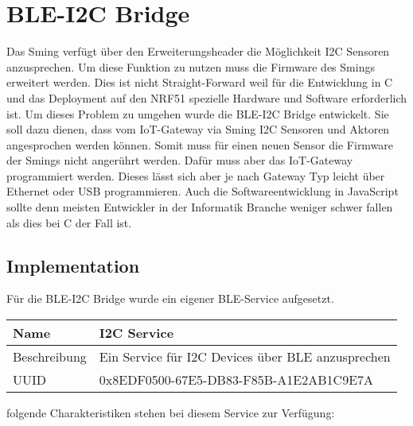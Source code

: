 \chapter{BLE-I2C Bridge}
\label{bleI2cBridge}

Das Sming verfügt über den Erweiterungsheader die Möglichkeit I2C Sensoren anzusprechen. Um diese Funktion zu nutzen muss die Firmware des Smings erweitert werden. Dies ist nicht Straight-Forward weil für die Entwicklung in C und das Deployment auf den NRF51 spezielle Hardware und Software erforderlich ist. Um dieses Problem zu umgehen wurde die BLE-I2C Bridge entwickelt. Sie soll dazu dienen, dass vom IoT-Gateway via Sming I2C Sensoren und Aktoren angesprochen werden können. Somit muss für einen neuen Sensor die Firmware der Smings nicht angerührt werden. Dafür muss aber das IoT-Gateway programmiert werden. Dieses lässt sich aber je nach Gateway Typ leicht über Ethernet oder USB programmieren. Auch die Softwareentwicklung in JavaScript sollte denn meisten Entwickler in der Informatik Branche weniger schwer fallen als dies bei C der Fall ist.

\section{Implementation}
\label{bleI2cImplementation}

Für die BLE-I2C Bridge wurde ein eigener BLE-Service aufgesetzt.

\begin{tabularx}{\textwidth}{|l|X|}
\hline
Name & I2C Service                                       \\
\hline
Beschreibung & Ein Service für I2C Devices über BLE anzusprechen \\
\hline
UUID	&    0x8EDF0500-67E5-DB83-F85B-A1E2AB1C9E7A  \\
\hline                                            
\end{tabularx}

folgende Charakteristiken stehen bei diesem Service zur Verfügung:

